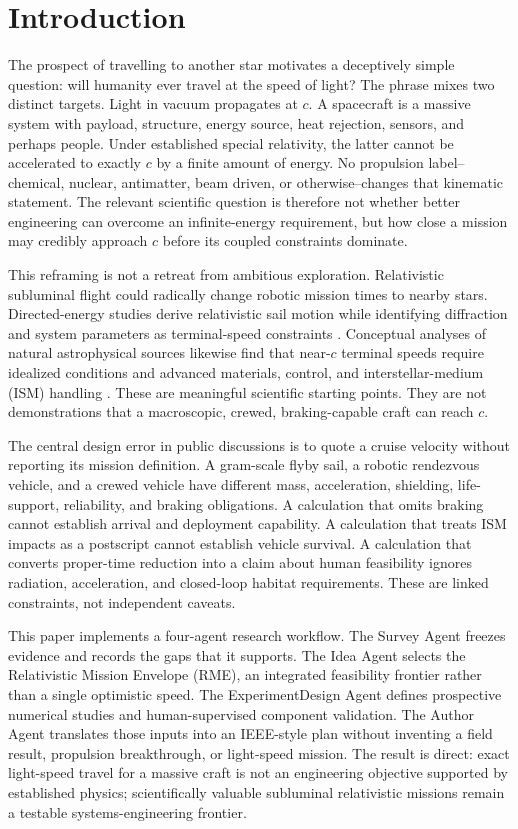 \documentclass[conference]{../../../../Conference-LaTeX-template_10-17-19/IEEEtran}
\begin{document}
\section{Introduction}
The prospect of travelling to another star motivates a deceptively simple question: will humanity ever travel at the speed of light? The phrase mixes two distinct targets. Light in vacuum propagates at $c$. A spacecraft is a massive system with payload, structure, energy source, heat rejection, sensors, and perhaps people. Under established special relativity, the latter cannot be accelerated to exactly $c$ by a finite amount of energy. No propulsion label--chemical, nuclear, antimatter, beam driven, or otherwise--changes that kinematic statement. The relevant scientific question is therefore not whether better engineering can overcome an infinite-energy requirement, but how close a mission may credibly approach $c$ before its coupled constraints dominate.

This reframing is not a retreat from ambitious exploration. Relativistic subluminal flight could radically change robotic mission times to nearby stars. Directed-energy studies derive relativistic sail motion while identifying diffraction and system parameters as terminal-speed constraints \cite{kulkarni2018}. Conceptual analyses of natural astrophysical sources likewise find that near-$c$ terminal speeds require idealized conditions and advanced materials, control, and interstellar-medium (ISM) handling \cite{lingam2020}. These are meaningful scientific starting points. They are not demonstrations that a macroscopic, crewed, braking-capable craft can reach $c$.

The central design error in public discussions is to quote a cruise velocity without reporting its mission definition. A gram-scale flyby sail, a robotic rendezvous vehicle, and a crewed vehicle have different mass, acceleration, shielding, life-support, reliability, and braking obligations. A calculation that omits braking cannot establish arrival and deployment capability. A calculation that treats ISM impacts as a postscript cannot establish vehicle survival. A calculation that converts proper-time reduction into a claim about human feasibility ignores radiation, acceleration, and closed-loop habitat requirements. These are linked constraints, not independent caveats.

This paper implements a four-agent research workflow. The Survey Agent freezes evidence and records the gaps that it supports. The Idea Agent selects the Relativistic Mission Envelope (RME), an integrated feasibility frontier rather than a single optimistic speed. The ExperimentDesign Agent defines prospective numerical studies and human-supervised component validation. The Author Agent translates those inputs into an IEEE-style plan without inventing a field result, propulsion breakthrough, or light-speed mission. The result is direct: exact light-speed travel for a massive craft is not an engineering objective supported by established physics; scientifically valuable subluminal relativistic missions remain a testable systems-engineering frontier.
\end{document}

